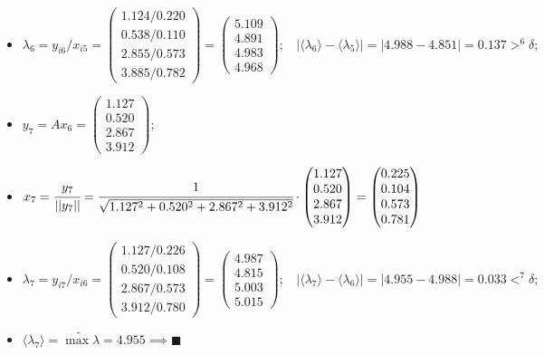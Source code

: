 \begin{itemize}
    \item
    $\lambda_6 = y_{i6} / x_{i5} =
    \begin{pmatrix}
        1.124/0.220\\
        0.538/0.110\\
        2.855/0.573\\
        3.885/0.782
    \end{pmatrix} =
    \begin{pmatrix}
        5.109\\4.891\\4.983\\4.968
    \end{pmatrix};~~~~
    |\langle\lambda_6\rangle-\langle\lambda_5\rangle| = |4.988-4.851| = 0.137 >^6 \delta;$



    \item
    $y_7 = Ax_6 =
    \begin{pmatrix}
        1.127\\0.520\\2.867\\3.912
    \end{pmatrix};$

    \item
    $x_7 = \cfrac{y_7}{||y_7||} = \cfrac{1}{\sqrt{1.127^2+0.520^2+2.867^2+3.912^2}}\cdot
    \begin{pmatrix}
        1.127\\0.520\\2.867\\3.912
    \end{pmatrix} =
    \begin{pmatrix}
        0.225\\0.104\\0.573\\0.781
    \end{pmatrix}$

    \item
    $\lambda_7 = y_{i7} / x_{i6} =
    \begin{pmatrix}
        1.127/0.226\\
        0.520/0.108\\
        2.867/0.573\\
        3.912/0.780
    \end{pmatrix} =
    \begin{pmatrix}
        4.987\\4.815\\5.003\\5.015
    \end{pmatrix};~~~~
    |\langle\lambda_7\rangle-\langle\lambda_6\rangle| = |4.955-4.988| = 0.033 <^7 \delta;$

    \item $\langle\lambda_7\rangle = \widetilde{\max{\lambda}} = 4.955 \implies \blacksquare $
\end{itemize}